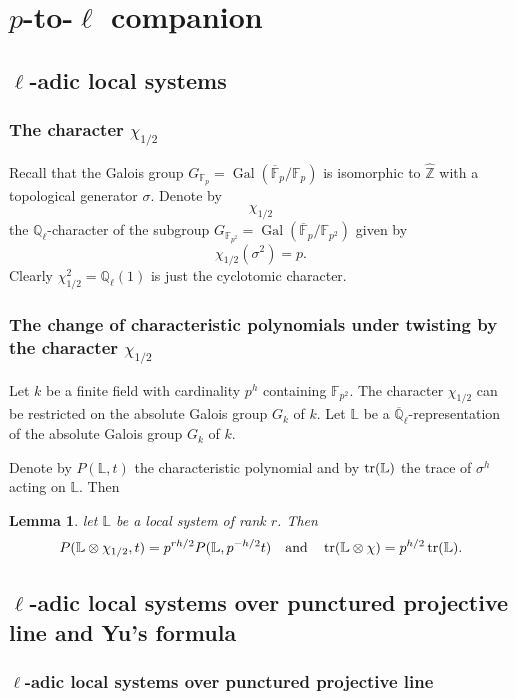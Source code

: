 \documentclass[12pt,twoside]{book}
\theoremstyle{plain}
\newtheorem{lemma}[lemma]{Lemma}
\theoremstyle{definition}
\theoremstyle{remark}
\newcommand{\bF}{{\mathbb F}}
\newcommand{\bL}{{\mathbb L}}
\newcommand{\bQ}{{\mathbb Q}}
\newcommand{\bZ}{{\mathbb Z}}
\DeclareMathOperator\Gal{Gal}
\newcommand{\Qbar}{{\overline{\mathbb Q}}}
\numberwithin{equation}{section}
\begin{document}
\newpage

\section{\bf $p$-to-$\ell$ companion} \label{sec_main_p_to_l_bijections}

\subsection{$\ell$-adic local systems}
\subsubsection{The character $\chi_{1/2}$}
Recall that the Galois group $G_{\bF_{p}}=\Gal(\overline{\bF}_{p}/\bF_{p})$ is isomorphic to $\widehat{\bZ}$ with a topological generator $\sigma$. Denote by
\[\chi_{1/2}\]
the $\bQ_\ell$-character of the subgroup $G_{\bF_{p^2}}=\Gal(\overline{\bF}_{p}/\bF_{p^2})$
given by
\[\chi_{1/2}(\sigma^{2}) = p.\]
Clearly $\chi_{1/2}^2=\bQ_\ell(1)$ is just the cyclotomic character.

\subsubsection{The change of characteristic polynomials under twisting by the character $\chi_{1/2}$}

Let $k$ be a finite field with cardinality $p^h$ containing $\bF_{p^2}$. The character $\chi_{1/2}$ can be restricted on the absolute Galois group $G_k$ of $k$. Let $\bL$ be a $\Qbar_\ell$-representation of the absolute Galois group $G_k$ of $k$.

Denote by $P(\bL,t)$ the characteristic polynomial and by $\tr(\bL)$ the trace of $\sigma^h$ acting on $\bL$. Then
\begin{lemma} let $\bL$ be a local system of rank $r$. Then
\[P(\bL\otimes \chi_{1/2},t) = p^{rh/2}P(\bL,p^{-h/2}t) \quad \text{and} \quad \tr(\bL\otimes\chi) = p^{h/2}\tr(\bL).\]
\end{lemma}

\newpage

\subsection{$\ell$-adic local systems over punctured projective line and Yu's formula}

\subsubsection{$\ell$-adic local systems over punctured projective line}
\end{document}
